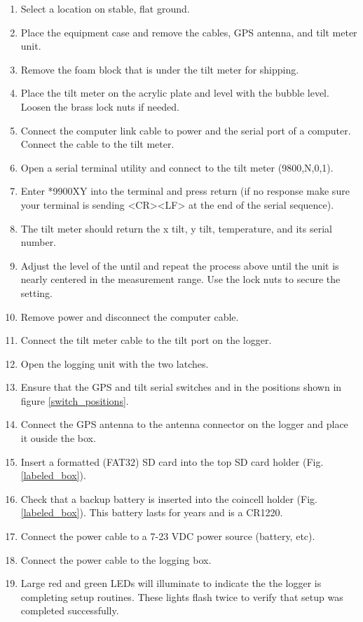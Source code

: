 \documentclass[11pt]{article} %
\begin{document}
\begin{enumerate}
\item Select a location on stable, flat ground.
\item Place the equipment case and remove the cables, GPS antenna, and tilt meter unit.
\item Remove the foam block that is under the tilt meter for shipping.
\item Place the tilt meter on the acrylic plate and level with the bubble level. Loosen the brass lock nuts if needed.
\item Connect the computer link cable to power and the serial port of a computer. Connect the cable to the tilt meter.
\item Open a serial terminal utility and connect to the tilt meter (9800,N,0,1).
\item Enter *9900XY into the terminal and press return (if no response make sure your terminal is sending <CR><LF> at the end of the serial sequence).
\item The tilt meter should return the x tilt, y tilt, temperature, and its serial number.
\item Adjust the level of the until and repeat the process above until the unit is nearly centered in the measurement range. Use the lock nuts to secure the setting.
\item Remove power and disconnect the computer cable. 
\item Connect the tilt meter cable to the tilt port on the logger.
\item Open the logging unit with the two latches.
\item Ensure that the GPS and tilt serial switches and in the positions shown in figure \ref{switch_positions}.
\item Connect the GPS antenna to the antenna connector on the logger and place it ouside the box.
\item Insert a formatted (FAT32) SD card into the top SD card holder (Fig.\ref{labeled_box}).
\item Check that a backup battery is inserted into the coincell holder (Fig.\ref{labeled_box}). This battery lasts for years and is a CR1220. 
\item Connect the power cable to a 7-23 VDC power source (battery, etc).
\item Connect the power cable to the logging box. 
\item Large red and green LEDs will illuminate to indicate the the logger is completing setup routines. These lights flash twice to verify that setup was completed successfully.

\end{enumerate}
\end{document}
